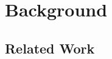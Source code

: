 \documentclass{article}
\theoremstyle{plain}
\theoremstyle{definition}
\theoremstyle{remark}
\begin{document}


\section{Background}
\subsection{Related Work}
\end{document}
